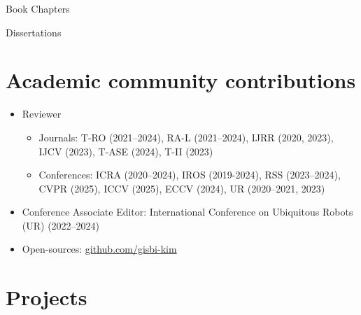 \documentclass{cv} %
\begin{document}
\vspace{-2mm}
\begin{pubSubsectionNum}{Book Chapters}
  \item {}
\end{pubSubsectionNum}

\vspace{-2mm}
\begin{pubSubsectionNum}{Dissertations}
  \item {}
  \item {}
\end{pubSubsectionNum}


\section{Academic community contributions}
\begin{itemize}[label=$\cdot$]
\item Reviewer
\vspace{-2mm}
\begin{itemize}[label=$\cdot$]
\item Journals:  T-RO (2021--2024), RA-L (2021--2024), IJRR (2020, 2023), IJCV (2023), T-ASE (2024), T-II (2023)
\vspace{-2mm}
\item Conferences: ICRA (2020--2024), IROS (2019-2024), RSS (2023--2024), CVPR (2025), ICCV (2025), ECCV (2024), UR (2020--2021, 2023)
\end{itemize}
\vspace{-1mm}
\item Conference Associate Editor: International Conference on Ubiquitous Robots (UR) (2022--2024) 
\vspace{-1mm}
\item Open-sources: \href{https://github.com/gisbi-kim}{github.com/gisbi-kim}
\vspace{-1mm}
\end{itemize}


\section{Projects}
\end{document}
